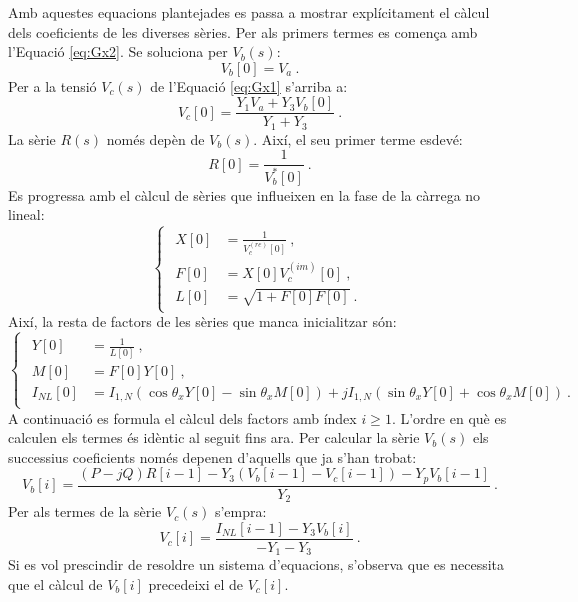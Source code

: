Amb aquestes equacions plantejades es passa a mostrar explícitament el càlcul dels coeficients de les diverses sèries. Per als primers termes es comença amb l'Equació \ref{eq:Gx2}. Se soluciona per $V_b(s)$:
\begin{equation}
    V_b[0]=V_a\ .
    \label{eq:Hx1}
\end{equation}
Per a la tensió $V_c(s)$ de l'Equació \ref{eq:Gx1} s'arriba a:
\begin{equation}
    V_c[0]=\frac{Y_1V_a+Y_3V_b[0]}{Y_1+Y_3}\ .
    \label{eq:Hx2}
\end{equation}
La sèrie $R(s)$ només depèn de $V_b(s)$. Així, el seu primer terme esdevé:
\begin{equation}
    R[0]=\frac{1}{V^*_b[0]}\ .
    \label{eq:Hx3}
\end{equation}
Es progressa amb el càlcul de sèries que influeixen en la fase de la càrrega no lineal:
\begin{equation}
    \begin{cases}
\begin{split}
X[0]&=\frac{1}{V_c^{(re)}[0]}\ ,\\
F[0]&=X[0]V_c^{(im)}[0]\ ,\\
L[0]&=\sqrt{1+F[0]F[0]}\ .
\end{split}
\end{cases}
\label{eq:Hx4}
\end{equation}
Així, la resta de factors de les sèries que manca inicialitzar són:
\begin{equation}
    \begin{cases}
\begin{split}
Y[0]&=\frac{1}{L[0]}\ ,
\\
M[0]&=F[0]Y[0]\ ,
\\
I_{NL}[0]&=I_{1,N}(\cos\theta_xY[0]-\sin\theta_xM[0])+jI_{1,N}(\sin\theta_xY[0]+\cos\theta_xM[0])\ .
\end{split}
\end{cases}
\label{eq:Hx5}
\end{equation}
A continuació es formula el càlcul dels factors amb índex $i\geq1$. L'ordre en què es calculen els termes és idèntic al seguit fins ara. Per calcular la sèrie $V_b(s)$ els successius coeficients només depenen d'aquells que ja s'han trobat:
\begin{equation}
    V_b[i]=\frac{(P-jQ)R[i-1]-Y_3(V_b[i-1]-V_c[i-1])-Y_pV_b[i-1]}{Y_2}\ .
    \label{eq:Hx6}
\end{equation}
Per als termes de la sèrie $V_c(s)$ s'empra:
\begin{equation}
    V_c[i]=\frac{I_{NL}[i-1]-Y_3V_b[i]}{-Y_1-Y_3}\ .
    \label{eq:Hx7}
\end{equation}
Si es vol prescindir de resoldre un sistema d'equacions, s'observa que es necessita que el càlcul de $V_b[i]$ precedeixi el de $V_c[i]$. 

